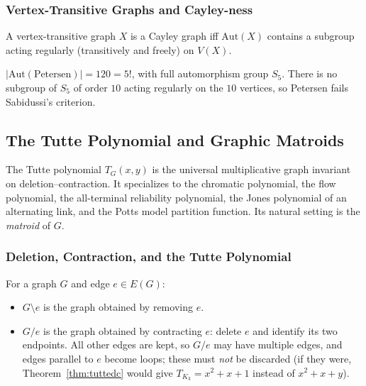 \subsubsection{Vertex-Transitive Graphs and Cayley-ness}

\begin{theorem}[Sabidussi, 1958]
A vertex-transitive graph $X$ is a Cayley graph iff $\mathrm{Aut}(X)$
contains a subgroup acting regularly (transitively and freely) on
$V(X)$.
\end{theorem}

\begin{example}
$|\mathrm{Aut}(\text{Petersen})| = 120 = 5!$, with full automorphism
group $S_5$. There is no subgroup of $S_5$ of order $10$ acting
regularly on the $10$ vertices, so Petersen fails Sabidussi's
criterion.
\end{example}

\subsection{The Tutte Polynomial and Graphic Matroids}\label{subsec:tutte-polynomial}

The Tutte polynomial $T_G(x, y)$ is the universal multiplicative
graph invariant on deletion--contraction. It specializes to the
chromatic polynomial, the flow polynomial, the all-terminal
reliability polynomial, the Jones polynomial of an alternating link,
and the Potts model partition function. Its natural setting is the
\emph{matroid} of $G$.

\subsubsection{Deletion, Contraction, and the Tutte Polynomial}

\begin{definition}
For a graph $G$ and edge $e \in E(G)$:
\begin{itemize}
  \item $G \setminus e$ is the graph obtained by removing $e$.
  \item $G / e$ is the graph obtained by contracting $e$: delete $e$
        and identify its two endpoints. All other edges are kept, so
        $G / e$ may have multiple edges, and edges parallel to $e$
        become loops; these must \emph{not} be discarded (if they were,
        Theorem~\ref{thm:tuttedc} would give $T_{K_3} = x^2 + x + 1$
        instead of $x^2 + x + y$).
\end{itemize}
\end{definition}

